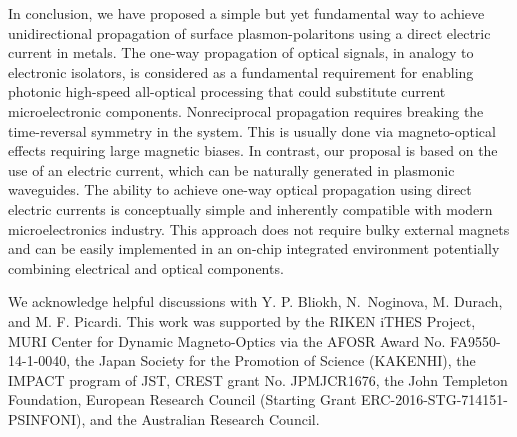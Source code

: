 \documentclass[9pt,twocolumn,twoside]{osajnl}
\begin{document}
In conclusion, we have proposed a simple but yet fundamental way to achieve unidirectional propagation of surface plasmon-polaritons using a direct electric current in  metals. The one-way propagation of optical signals, in analogy to electronic isolators, is considered as a fundamental requirement for enabling photonic high-speed all-optical processing that could substitute current microelectronic components. Nonreciprocal propagation requires breaking the time-reversal symmetry in the system. This is usually done via magneto-optical effects requiring large magnetic biases. In contrast, our proposal is based on the use of an electric current, which can be naturally generated in plasmonic waveguides. The ability to achieve one-way optical propagation using direct electric currents is conceptually simple and inherently compatible with modern microelectronics industry. This approach does not require bulky external magnets and can be easily implemented in an on-chip integrated environment potentially combining electrical and optical components.

We acknowledge helpful discussions with Y. P. Bliokh, N.~Noginova, M. Durach, and M. F. Picardi. This work was supported by the RIKEN iTHES Project, MURI Center for Dynamic Magneto-Optics via the AFOSR Award No. FA9550-14-1-0040, the Japan Society for the Promotion of Science (KAKENHI), the IMPACT program of JST, CREST grant No. JPMJCR1676, the John Templeton Foundation, European Research Council (Starting Grant ERC-2016-STG-714151-PSINFONI), and the Australian Research Council.

\bigskip


\end{document}
